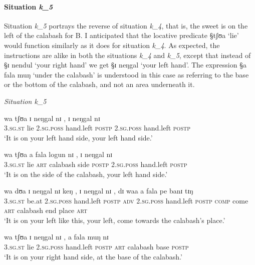 \paragraph{Situation {\it k_{5}}}
\label{sec:SPA-exper1-loca}

Situation {\it k_{5}} portrays the reverse of situation {\it k_{4}}, that is,
the sweet is on the left of the calabash for B.  I anticipated that the 
locative  predicate {\S tʃʊa} `lie'  would function similarly as it does for
situation   {\it k_{4}}.  As expected,  the instructions are alike in both the 
situations  {\it k_{4}} and  {\it k_{5}},  except that instead of {\S ɪ nendul}
`your right hand'  we get {\S ɪ neŋgal} `your left hand'. The expression {\S a
fala muŋ} `under the calabash' is
understood in this case as referring to the base or the bottom of the
calabash, and not an 
area underneath it. 



\begin{exe}
\ex\label{ex:k5}\textit{Situation {\it k_{5}}}\\
 \begin{xlist}
  \ex\label{ex:k5-A-w}
\gll  wa tʃʊa ɪ neŋgal nɪ , ɪ neŋgal nɪ\\
\textsc{3.sg.st} lie \textsc{2.sg.poss} hand.left \textsc{postp} {}
\textsc{2.sg.poss} hand.left \textsc{postp}\\
\glt `It is on your left hand side, your left hand side.'

\ex\label{ex:k5-A-d}
\gll  wa tʃʊa a fala logun nɪ , ɪ neŋgal nɪ\\
\textsc{3.sg.st} lie \textsc{art} calabash side  \textsc{postp} {}
\textsc{2.sg.poss} hand.left \textsc{postp}\\
\glt `It is on the side of the calabash, your left hand side.'

\ex\label{ex:k5-B-t}

\gll wa dʊa ɪ neŋgal nɪ keŋ , ɪ neŋgal nɪ , dɪ waa a fala pe banɪ tɪŋ \\
\textsc{3.sg.st} be.at \textsc{2.sg.poss} hand.left \textsc{postp} \textsc{adv} 
{}   \textsc{2.sg.poss} hand.left \textsc{postp} {} \textsc{comp} come
\textsc{art} calabash end  place \textsc{art}\\
 
\glt `It is on your left like this, your left, come towards the calabash's 
place.'

\ex\label{ex:k5-B-m}
\gll  wa tʃʊa ɪ neŋgal nɪ , a fala muŋ nɪ\\
\textsc{3.sg.st} lie \textsc{2.sg.poss} hand.left \textsc{postp} {} \textsc{art}
calabash base \textsc{postp}\\
\glt `It is on your right hand side, at the base of the calabash.'
 \end{xlist}

\end{exe}



